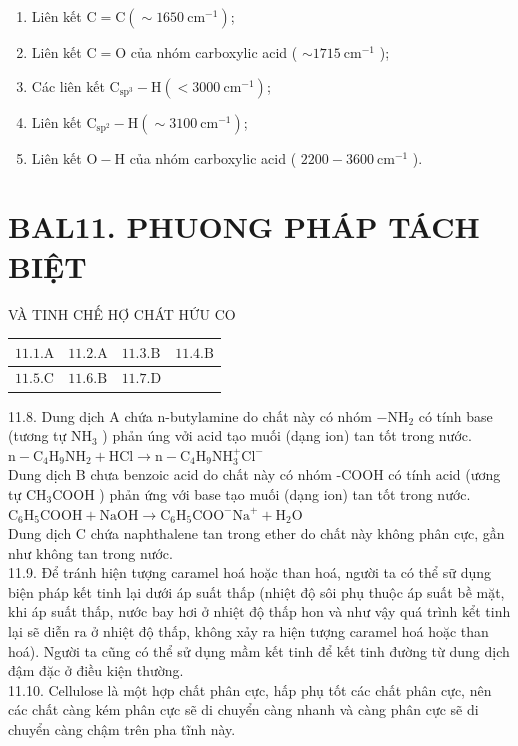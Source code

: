 \documentclass[10pt]{article}
\begin{document}
\begin{enumerate}
  \item Liên kết $\mathrm{C}=\mathrm{C}\left(\sim 1650 \mathrm{~cm}^{-1}\right)$;
  \item Liên kết $\mathrm{C}=\mathrm{O}$ của nhóm carboxylic acid ( $\sim 1715 \mathrm{~cm}^{-1}$ );
  \item Các liên kết $\mathrm{C}_{\mathrm{sp}^{3}}-\mathrm{H}\left(<3000 \mathrm{~cm}^{-1}\right)$;
  \item Liên kết $\mathrm{C}_{\mathrm{sp}^{2}}-\mathrm{H}\left(\sim 3100 \mathrm{~cm}^{-1}\right)$;
  \item Liên kết $\mathrm{O}-\mathrm{H}$ của nhóm carboxylic acid ( $2200-3600 \mathrm{~cm}^{-1}$ ).
\end{enumerate}

\section*{BAL11. PHUONG PHÁP TÁCH BIỆT}
VÀ TINH CHẾ HỢ CHÁT HỨU CO

\begin{center}
\begin{tabular}{|l|l|l|l|}
\hline
$11.1 . \mathrm{A}$ & $11.2 . \mathrm{A}$ & $11.3 . \mathrm{B}$ & $11.4 . \mathrm{B}$ \\
\hline
$11.5 . \mathrm{C}$ & $11.6 . \mathrm{B}$ & $11.7 . \mathrm{D}$ &  \\
\hline
\end{tabular}
\end{center}

11.8. Dung dịch A chứa n-butylamine do chất này có nhóm $-\mathrm{NH}_{2}$ có tính base (tương tự $\mathrm{NH}_{3}$ ) phản úng vởi acid tạo muối (dạng ion) tan tốt trong nước.\\
$\mathrm{n}-\mathrm{C}_{4} \mathrm{H}_{9} \mathrm{NH}_{2}+\mathrm{HCl} \longrightarrow \mathrm{n}-\mathrm{C}_{4} \mathrm{H}_{9} \mathrm{NH}_{3}^{+} \mathrm{Cl}^{-}$\\
Dung dịch B chưa benzoic acid do chất này có nhóm -COOH có tính acid (ương tự $\mathrm{CH}_{3} \mathrm{COOH}$ ) phản ứng với base tạo muối (dạng ion) tan tốt trong nước.\\
$\mathrm{C}_{6} \mathrm{H}_{5} \mathrm{COOH}+\mathrm{NaOH} \longrightarrow \mathrm{C}_{6} \mathrm{H}_{5} \mathrm{COO}^{-} \mathrm{Na}^{+}+\mathrm{H}_{2} \mathrm{O}$\\
Dung dịch C chứa naphthalene tan trong ether do chất này không phân cực, gần như không tan trong nước.\\
11.9. Để tránh hiện tượng caramel hoá hoặc than hoá, người ta có thể sữ dụng biện pháp kết tinh lại dưới áp suất thấp (nhiệt độ sôi phụ thuộc áp suất bề mặt, khi áp suất thấp, nước bay hơi ở nhiệt độ thấp hon và như vậy quá trình kểt tinh lại sẽ diễn ra ở nhiệt độ thấp, không xảy ra hiện tượng caramel hoá hoặc than hoá). Người ta cũng có thể sử dụng mầm kết tinh để kết tinh đường từ dung dịch đậm đặc ở điều kiện thường.\\
11.10. Cellulose là một hợp chất phân cực, hấp phụ tốt các chất phân cực, nên các chất càng kém phân cực sẽ di chuyển càng nhanh và càng phân cực sẽ di chuyển càng chậm trên pha tĩnh này.
\end{document}
